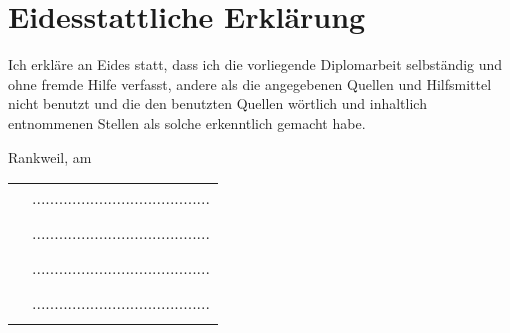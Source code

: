 \section{Eidesstattliche Erklärung}
Ich erkläre an Eides statt, dass ich die vorliegende Diplomarbeit selbständig und ohne fremde Hilfe verfasst, andere als die angegebenen Quellen und Hilfsmittel nicht benutzt und die den benutzten Quellen wörtlich und inhaltlich entnommenen Stellen als solche erkenntlich gemacht habe.
\par Rankweil, am \PrintDate \\		
\begin{tabular}{p{7cm}C{6cm}}
	\hspace{1cm}  & ........................................ \\ 
	& \nameSH \\ [2.5em]
	
	\hspace{1cm}  & ........................................ \\ 
	& \nameJS \\ [2.5em]

    \hspace{1cm}  & ........................................ \\ 
	& \nameCZ \\ [2.5em]

    \hspace{1cm}  & ........................................ \\ 
	& \nameSB \\ [2.5em]
\end{tabular}